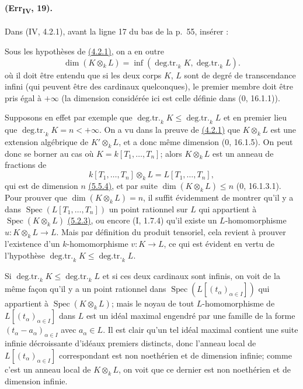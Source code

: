 \paragraph{(Err\textsubscript{IV}, 19).}
Dans (IV, 4.2.1), avant la ligne 17 du bas de la p.~55, insérer :

\begin{remark}[4.2.1.4]
\label{IV.4.2.1.4}
Sous les hypothèses de {\hyperlink{ega4.c04.prop.4-2-1}{(4.2.1)}}, on a
en outre
\begin{equation}
 \dim(K\otimes_kL)=
 \inf(\operatorname{deg.tr.}_kK,\operatorname{deg.tr.}_kL).
 \label{IV.4.2.1.5}\tag{4.2.1.5}
\end{equation}
où il doit être entendu que si les deux corps $K$, $L$ sont de degré de
transcendance infini (qui peuvent être des cardinaux quelconques), le
premier membre doit être pris égal à $+\infty$ (la dimension considérée
ici est celle définie dans ($0$, 16.1.1)).

Supposons en effet par exemple que
$\operatorname{deg.tr.}_kK\leq\operatorname{deg.tr.}_kL$ et en premier
lieu que $\operatorname{deg.tr.}_kK=n<+\infty$. On a vu dans la preuve
de {\hyperlink{ega4.c04.prop.4-2-1}{(4.2.1)}} que $K\otimes_kL$ est une
extension algébrique de $K'\otimes_kL$, et a donc même dimension
($0$, 16.1.5). On peut donc se borner au cas où
$K=k[T_1,\ldots,T_n]$; alors $K\otimes_kL$ est un anneau de fractions
de
\[
 k[T_1,\ldots,T_n]\otimes_kL=L[T_1,\ldots,T_n],
\]
qui est de dimension $n$ {\hyperlink{ega4.c04.cor.5-5-4}{(5.5.4)}}, et
par suite $\dim(K\otimes_kL)\leq n$ ($0$, 16.1.3.1). Pour prouver que
$\dim(K\otimes_kL)=n$, il suffit évidemment de montrer qu'il y a dans
$\operatorname{Spec}(L[T_1,\ldots,T_n])$ un point rationnel sur $L$
qui appartient à $\operatorname{Spec}(K\otimes_kL)$
{\hyperlink{ega4.c04.cor.5-2-3}{(5.2.3)}}, ou encore (I, 1.7.4) qu'il
existe un $L$-homomorphisme $u:K\otimes_kL\to L$. Mais par définition
du produit tensoriel, cela revient à prouver l'existence d'un
$k$-homomorphisme $v:K\to L$, ce qui est évident en vertu de
l'hypothèse
$\operatorname{deg.tr.}_kK\leq\operatorname{deg.tr.}_kL$.

Si $\operatorname{deg.tr.}_kK\leq\operatorname{deg.tr.}_kL$ et si ces
deux cardinaux sont infinis, on voit de la même façon qu'il y a un point
rationnel dans $\operatorname{Spec}(L[(t_\alpha)_{\alpha\in I}])$ qui
appartient à $\operatorname{Spec}(K\otimes_kL)$; mais le noyau de tout
$L$-homomorphisme de $L[(t_\alpha)_{\alpha\in I}]$ dans $L$ est un
idéal maximal engendré par une famille de la forme
$(t_\alpha-a_\alpha)_{\alpha\in I}$ avec $a_\alpha\in L$. Il est clair
qu'un tel idéal maximal contient une suite infinie décroissante
d'idéaux premiers distincts, donc l'anneau local de
$L[(t_\alpha)_{\alpha\in I}]$ correspondant est non noethérien et de
dimension infinie; comme c'est un anneau local de $K\otimes_kL$, on
voit que ce dernier est non noethérien et de dimension infinie.
\end{remark}

